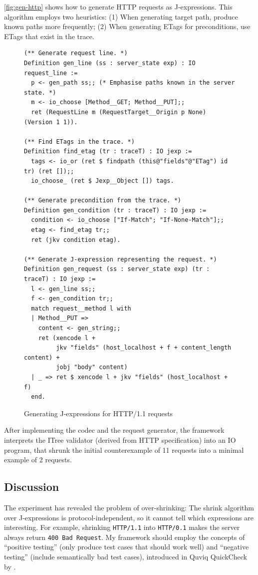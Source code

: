\documentclass{article}
\newcommand{\http}{HTTP/1.1\xspace}
\newcommand{\ilc}[1]{\lstinline[style=customcoq]{#1}}
\theoremstyle{definition}
\begin{document}
\autoref{fig:gen-http} shows how to generate HTTP requests as J-expressions.
This algorithm employs two heuristics: (1) When generating target path, produce
known paths more frequently; (2) When generating ETags for preconditions, use
ETags that exist in the trace.

\begin{figure}
  \begin{lstlisting}[style=customcoq]
(** Generate request line. *)
Definition gen_line (ss : server_state exp) : IO request_line :=
  p <- gen_path ss;; (* Emphasise paths known in the server state. *)
  m <- io_choose [Method__GET; Method__PUT];;
  ret (RequestLine m (RequestTarget__Origin p None) (Version 1 1)).

(** Find ETags in the trace. *)
Definition find_etag (tr : traceT) : IO jexp :=
  tags <- io_or (ret $ findpath (this@"fields"@"ETag") id tr) (ret []);;
  io_choose_ (ret $ Jexp__Object []) tags.

(** Generate precondition from the trace. *)
Definition gen_condition (tr : traceT) : IO jexp :=
  condition <- io_choose ["If-Match"; "If-None-Match"];;
  etag <- find_etag tr;;
  ret (jkv condition etag).

(** Generate J-expression representing the request. *)
Definition gen_request (ss : server_state exp) (tr : traceT) : IO jexp :=
  l <- gen_line ss;;
  f <- gen_condition tr;;
  match request__method l with
  | Method__PUT =>
    content <- gen_string;;
    ret (xencode l +
         jkv "fields" (host_localhost + f + content_length content) +
         jobj "body" content)
  | _ => ret $ xencode l + jkv "fields" (host_localhost + f)
  end.
  \end{lstlisting}
  \caption{Generating J-expressions for \http requests}
  \label{fig:gen-http}
\end{figure}

After implementing the codec and the request generator, the framework interprets
the ITree validator (derived from HTTP specification) into an IO program, that
shrunk the initial counterexample of 11 requests into a minimal example of 2
requests.

\subsection{Discussion}
The experiment has revealed the problem of over-shrinking: The shrink algorithm
over J-expressions is protocol-independent, so it cannot tell which expressions
are interesting.  For example, shrinking \ilc{HTTP/1.1} into \ilc{HTTP/0.1}
makes the server always return \ilc{400 Bad Request}.  My framework should
employ the concepts of ``positive testing'' (only produce test cases that should
work well) and ``negative testing'' (include semantically bad test cases),
introduced in Quviq QuickCheck by \textcite{Quviq2006}.
\end{document}

